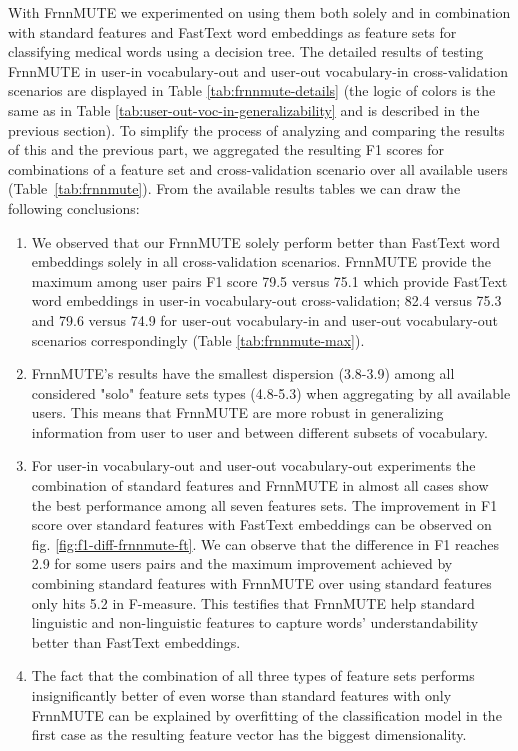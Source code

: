 With FrnnMUTE we experimented on using them both solely and in combination with standard features and FastText word embeddings as feature sets for classifying medical words using a decision tree. The detailed results of testing FrnnMUTE in user-in vocabulary-out and user-out vocabulary-in cross-validation scenarios are displayed in Table \ref{tab:frnnmute-details} (the logic of colors is the same as in Table \ref{tab:user-out-voc-in-generalizability} and is described in the previous section). To simplify the process of analyzing and comparing the results of this and the previous part, we aggregated the resulting F1 scores for combinations of a feature set and cross-validation scenario over all available users (Table~\ref{tab:frnnmute}).  From the available results tables we can draw the following conclusions:
\begin{enumerate}
    \item We observed that our FrnnMUTE solely perform better than FastText word embeddings solely in all cross-validation scenarios. FrnnMUTE provide the maximum among user pairs F1 score 79.5 versus 75.1 which provide FastText word embeddings in user-in vocabulary-out cross-validation; 82.4 versus 75.3 and 79.6 versus 74.9 for user-out vocabulary-in and user-out vocabulary-out scenarios correspondingly (Table \ref{tab:frnnmute-max}).
    \item FrnnMUTE's results have the smallest dispersion (3.8-3.9)  among all considered "solo" feature sets types (4.8-5.3) when aggregating by all available users. This means that FrnnMUTE are more robust in generalizing information from user to user and between different subsets of vocabulary.
    \item For user-in vocabulary-out and user-out vocabulary-out experiments the combination of standard features and FrnnMUTE in almost all cases show the best performance among all seven features sets. The improvement in F1 score over standard features with  FastText embeddings can be observed on fig. \ref{fig:f1-diff-frnnmute-ft}. We can observe that the difference in F1 reaches 2.9 for some users pairs and the maximum improvement achieved by combining standard features with FrnnMUTE over using standard features only hits 5.2 in F-measure.  This testifies that FrnnMUTE help standard linguistic and non-linguistic features to capture words' understandability better than FastText embeddings.  
    \item The fact that the combination of all three types of feature sets performs insignificantly better of even worse than standard features with only FrnnMUTE can be explained by overfitting of the classification model in the first case as the resulting feature vector has the biggest dimensionality.
\end{enumerate}


